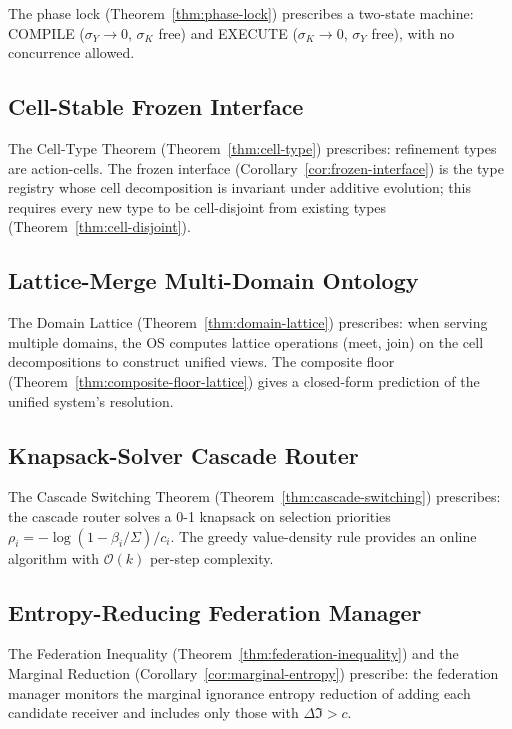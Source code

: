 \documentclass[11pt,a4paper]{article}
\newcommand{\Sigmax}{\Sigma}
\newcommand{\disp}{\sigma}
\begin{document}
The phase lock (Theorem~\ref{thm:phase-lock}) prescribes a two-state machine: COMPILE ($\disp_Y \to 0$, $\disp_K$ free) and EXECUTE ($\disp_K \to 0$, $\disp_Y$ free), with no concurrence allowed.

\subsection{Cell-Stable Frozen Interface}

The Cell-Type Theorem (Theorem~\ref{thm:cell-type}) prescribes: refinement types are action-cells. The frozen interface (Corollary~\ref{cor:frozen-interface}) is the type registry whose cell decomposition is invariant under additive evolution; this requires every new type to be cell-disjoint from existing types (Theorem~\ref{thm:cell-disjoint}).

\subsection{Lattice-Merge Multi-Domain Ontology}

The Domain Lattice (Theorem~\ref{thm:domain-lattice}) prescribes: when serving multiple domains, the OS computes lattice operations (meet, join) on the cell decompositions to construct unified views. The composite floor (Theorem~\ref{thm:composite-floor-lattice}) gives a closed-form prediction of the unified system's resolution.

\subsection{Knapsack-Solver Cascade Router}

The Cascade Switching Theorem (Theorem~\ref{thm:cascade-switching}) prescribes: the cascade router solves a 0-1 knapsack on selection priorities $\rho_i = -\log(1 - \beta_i/\Sigmax)/c_i$. The greedy value-density rule provides an online algorithm with $\mathcal{O}(k)$ per-step complexity.

\subsection{Entropy-Reducing Federation Manager}

The Federation Inequality (Theorem~\ref{thm:federation-inequality}) and the Marginal Reduction (Corollary~\ref{cor:marginal-entropy}) prescribe: the federation manager monitors the marginal ignorance entropy reduction of adding each candidate receiver and includes only those with $\Delta \mathfrak{I} > c$.
\end{document}
